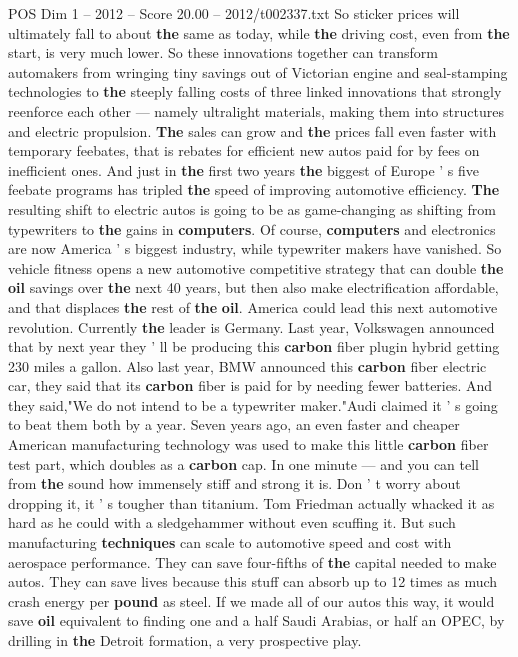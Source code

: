 \begin{textsample}{POS Dim 1 – 2012 – Score 20.00 – 2012/t002337.txt}
So sticker prices will ultimately fall to about \textbf{the} same as today, while \textbf{the} driving cost, even from \textbf{the} start, is very much lower.
So these innovations together can transform automakers from wringing tiny savings out of Victorian engine and seal-stamping technologies to \textbf{the} steeply falling costs of three linked innovations that strongly reenforce each other — namely ultralight materials, making them into structures and electric propulsion. \textbf{The} sales can grow and \textbf{the} prices fall even faster with temporary feebates, that is rebates for efficient new autos paid for by fees on inefficient ones.
And just in \textbf{the} first two years \textbf{the} biggest of Europe ' s five feebate programs has tripled \textbf{the} speed of improving automotive efficiency. \textbf{The} resulting shift to electric autos is going to be as game-changing as shifting from typewriters to \textbf{the} gains in \textbf{computers}.
Of course, \textbf{computers} and electronics are now America ' s biggest industry, while typewriter makers have vanished.
So vehicle fitness opens a new automotive competitive strategy that can double \textbf{the} \textbf{oil} savings over \textbf{the} next 40 years, but then also make electrification affordable, and that displaces \textbf{the} rest of \textbf{the} \textbf{oil}.
America could lead this next automotive revolution.
Currently \textbf{the} leader is Germany.
Last year, Volkswagen announced that by next year they ' ll be producing this \textbf{carbon} fiber plugin hybrid getting 230 miles a gallon.
Also last year, BMW announced this \textbf{carbon} fiber electric car, they said that its \textbf{carbon} fiber is paid for by needing fewer batteries.
And they said,"We do not intend to be a typewriter maker."Audi claimed it ' s going to beat them both by a year.
Seven years ago, an even faster and cheaper American manufacturing technology was used to make this little \textbf{carbon} fiber test part, which doubles as a \textbf{carbon} cap.
In one minute — and you can tell from \textbf{the} sound how immensely stiff and strong it is.
Don ' t worry about dropping it, it ' s tougher than titanium.
Tom Friedman actually whacked it as hard as he could with a sledgehammer without even scuffing it.
But such manufacturing \textbf{techniques} can scale to automotive speed and cost with aerospace performance.
They can save four-fifths of \textbf{the} capital needed to make autos.
They can save lives because this stuff can absorb up to 12 times as much crash energy per \textbf{pound} as steel.
If we made all of our autos this way, it would save \textbf{oil} equivalent to finding one and a half Saudi Arabias, or half an OPEC, by drilling in \textbf{the} Detroit formation, a very prospective play.

\end{textsample}
